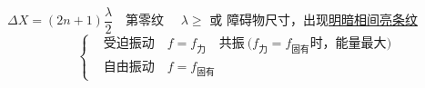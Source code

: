 $\Delta X=(2n+1)\dfrac{\lambda}{2}$　第零纹 %
　$\lambda\ge$ 或 \unclear{$\approx$} 障碍物尺寸，出现\underline{明暗相间亮条纹}
\[
\left\{\begin{aligned}
&\text{受迫振动}\quad f=f_{\text{力}}\quad\text{共振}\ \bigl(f_{\text{力}}=f_{\text{固有}}\text{时，能量最大}\bigr)\\
&\text{自由振动}\quad f=f_{\text{固有}}
\end{aligned}\right.
\]
